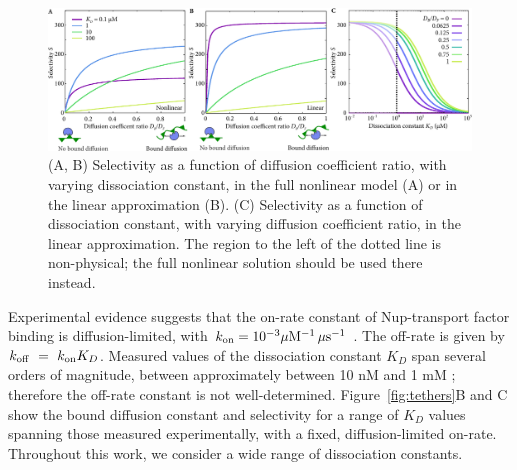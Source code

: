 \begin{figure}
\centering
\includegraphics[width=\linewidth]{figs/ch02/linear-selectivity.pdf}
\caption[Selectivity in the linear approximation.]{(A, B) Selectivity as a function of diffusion coefficient
  ratio, with varying dissociation constant, in the full nonlinear
  model (A) or in the linear approximation (B).  (C) Selectivity as a
  function of dissociation constant, with varying diffusion
  coefficient ratio, in the linear approximation.  The region to the
  left of the dotted line is non-physical; the full nonlinear solution
  should be used there instead.}
\label{fig:linear-selectivity}
\end{figure}

Experimental evidence suggests that the on-rate constant of Nup-transport factor binding is diffusion-limited, with $k_{\rm on} = 10^{-3}\mu \mathrm{M}^{-1} \, \mu \mathrm{s}^{-1}$ \cite{milles15, hough15}.  The off-rate is given by $k_{\rm off} ~=~k_{\rm on} K_D$.  Measured values of the dissociation constant $K_D$ span several orders of magnitude, between approximately between 10 nM and 1 mM \cite{pyhtila03, gilchrist02, tetenbaum-novatt12-1, milles15, timney16, vovk16, hayama18}; therefore the off-rate constant is not well-determined.  Figure~\ref{fig:tethers}B and C show the bound diffusion constant and selectivity for a range of $K_D$ values spanning those measured experimentally, with a fixed, diffusion-limited on-rate.  Throughout this work, we consider a wide range of dissociation constants.

